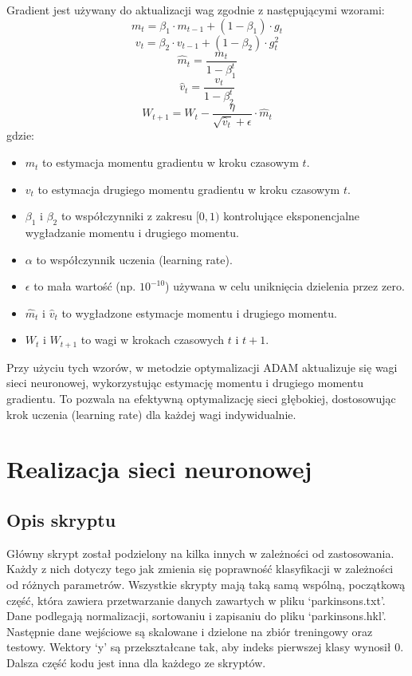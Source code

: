 \documentclass{article}
\begin{document}
Gradient jest używany do aktualizacji wag zgodnie z następującymi wzorami:
\[m_t = \beta_1 \cdot m_{t-1} + (1 - \beta_1) \cdot g_t\]
\[v_t = \beta_2 \cdot v_{t-1} + (1 - \beta_2) \cdot g_t^2\]
\[\hat{m}_t = \frac{m_t}{1 - \beta_1^t}\]
\[\hat{v}_t = \frac{v_t}{1 - \beta_2^t}\]
\[ W_{t+1} = W_t - \frac{\eta}{\sqrt{\hat{v}_t} + \epsilon} \cdot \hat{m}_t \]
gdzie:
\begin{itemize}
    \item \(m_t\) to estymacja momentu gradientu w kroku czasowym \(t\).
    \item \(v_t\) to estymacja drugiego momentu gradientu w kroku czasowym \(t\).
    \item \(\beta_1\) i \(\beta_2\) to współczynniki z zakresu \([0, 1)\) kontrolujące eksponencjalne wygładzanie momentu i drugiego momentu.
    \item \(\alpha\) to współczynnik uczenia (learning rate).
    \item \(\epsilon\) to mała wartość (np. \(10^{-10}\)) używana w celu uniknięcia dzielenia przez zero.
    \item \(\hat{m}_t\) i \(\hat{v}_t\) to wygładzone estymacje momentu i drugiego momentu.
    \item \(W_{t}\) i \(W_{t+1}\) to wagi w krokach czasowych \(t\) i \(t+1\).
\end{itemize}

Przy użyciu tych wzorów, w metodzie optymalizacji ADAM aktualizuje się wagi sieci neuronowej, wykorzystując estymację momentu i drugiego momentu gradientu.
To pozwala na efektywną optymalizację sieci głębokiej, dostosowując krok uczenia (learning rate) dla każdej wagi indywidualnie.

\section{Realizacja sieci neuronowej}
\subsection{Opis skryptu}

Główny skrypt został podzielony na kilka innych w zależności od zastosowania.
Każdy z nich dotyczy tego jak zmienia się poprawność klasyfikacji w zależności od różnych parametrów.
Wszystkie skrypty mają taką samą wspólną, początkową część, która zawiera przetwarzanie danych zawartych w pliku `parkinsons.txt'.
Dane podlegają normalizacji, sortowaniu i zapisaniu do pliku `parkinsons.hkl'.
Następnie dane wejściowe są skalowane i dzielone na zbiór treningowy oraz testowy.
Wektory `y' są przekształcane tak, aby indeks pierwszej klasy wynosił 0.
Dalsza część kodu jest inna dla każdego ze skryptów.
\end{document}
